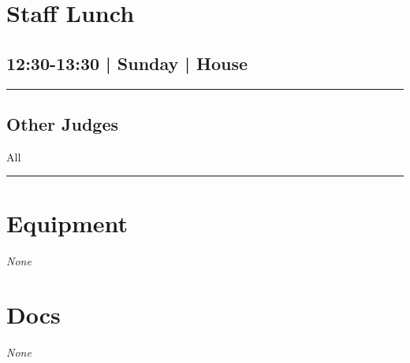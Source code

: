 \documentclass[10pt, A5]{article}
\begin{document}
        \begin{framed}
        \begin{minipage}{\textwidth}

        \setcounter{section}{81}
        \section{Staff Lunch}
        \subsection*{12:30-13:30 | Sunday | House}

        \vspace{0.25cm}
        \hrule
        \vspace{0.25cm}


        \subsection*{Other Judges}
                    All

            \vspace{0.25cm}
        \hrule
        \vspace{0.25cm}

        \begin{multicols}{2}

		\section*{\faWrench \: Equipment}

				\textit{None}
		
		\vfill\null
		\columnbreak

			\section*{\faFile \: Docs}
		 	\textit{None}
	

		\vfill\null

		\end{multicols}
\end{minipage}
\end{framed}
\end{document}
